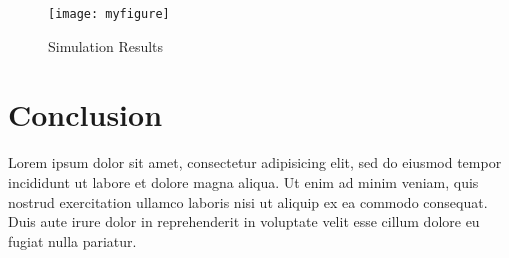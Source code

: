 \documentclass{article}
\begin{document}
\begin{figure}
    \centering
    \texttt{[image: myfigure]}
    \caption{Simulation Results}
    \label{simulationfigure}
\end{figure}


\section{Conclusion}

Lorem ipsum dolor sit amet, consectetur adipisicing elit, sed do eiusmod tempor
incididunt ut labore et dolore magna aliqua. Ut enim ad minim veniam, quis
nostrud exercitation ullamco laboris nisi ut aliquip ex ea commodo consequat.
Duis aute irure dolor in reprehenderit in voluptate velit esse cillum dolore eu
fugiat nulla pariatur.
\end{document}
